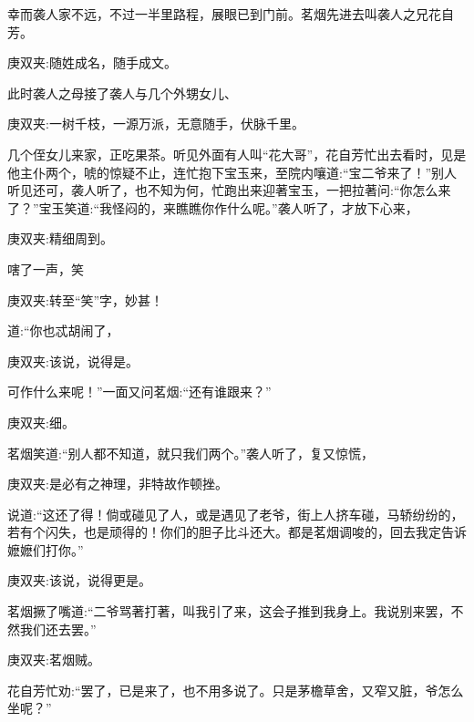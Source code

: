 \begin{parag}
    幸而袭人家不远，不过一半里路程，展眼已到门前。茗烟先进去叫袭人之兄花自芳。\begin{note}庚双夹:随姓成名，随手成文。\end{note}此时袭人之母接了袭人与几个外甥女儿、\begin{note}庚双夹:一树千枝，一源万派，无意随手，伏脉千里。\end{note}几个侄女儿来家，正吃果茶。听见外面有人叫“花大哥”，花自芳忙出去看时，见是他主仆两个，唬的惊疑不止，连忙抱下宝玉来，至院内嚷道:“宝二爷来了！”别人听见还可，袭人听了，也不知为何，忙跑出来迎著宝玉，一把拉著问:“你怎么来了？”宝玉笑道:“我怪闷的，来瞧瞧你作什么呢。”袭人听了，才放下心来，\begin{note}庚双夹:精细周到。\end{note}嗐了一声，笑\begin{note}庚双夹:转至“笑”字，妙甚！\end{note}道:“你也忒胡闹了，\begin{note}庚双夹:该说，说得是。\end{note}可作什么来呢！”一面又问茗烟:“还有谁跟来？”\begin{note}庚双夹:细。\end{note}茗烟笑道:“别人都不知道，就只我们两个。”袭人听了，复又惊慌，\begin{note}庚双夹:是必有之神理，非特故作顿挫。\end{note}说道:“这还了得！倘或碰见了人，或是遇见了老爷，街上人挤车碰，马轿纷纷的，若有个闪失，也是顽得的！你们的胆子比斗还大。都是茗烟调唆的，回去我定告诉嬷嬷们打你。”\begin{note}庚双夹:该说，说得更是。\end{note}茗烟撅了嘴道:“二爷骂著打著，叫我引了来，这会子推到我身上。我说别来罢，不然我们还去罢。”\begin{note}庚双夹:茗烟贼。\end{note}花自芳忙劝:“罢了，已是来了，也不用多说了。只是茅檐草舍，又窄又脏，爷怎么坐呢？”
\end{parag}



